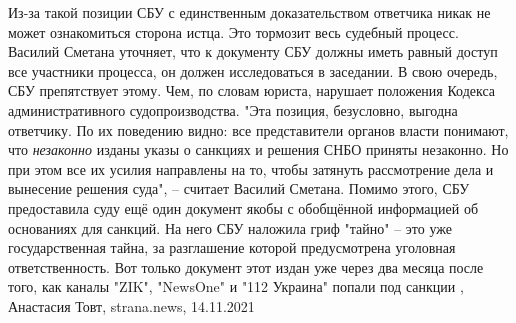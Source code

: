 Из-за такой позиции СБУ с единственным доказательством ответчика никак не может
ознакомиться сторона истца. Это тормозит весь судебный процесс.  Василий
Сметана уточняет, что к документу СБУ должны иметь равный доступ все участники
процесса, он должен исследоваться в заседании. В свою очередь, СБУ препятствует
этому. Чем, по словам юриста, нарушает положения Кодекса административного
судопроизводства.  "Эта позиция, безусловно, выгодна ответчику. По их поведению
видно: все представители органов власти понимают, что \emph{незаконно} изданы указы о
санкциях и решения СНБО приняты незаконно. Но при этом все их усилия направлены
на то, чтобы затянуть рассмотрение дела и вынесение решения суда", – считает
Василий Сметана.  Помимо этого, СБУ предоставила суду ещё один документ якобы с
обобщённой информацией об основаниях для санкций. На него СБУ наложила гриф
"тайно" – это уже государственная тайна, за разглашение которой предусмотрена
уголовная ответственность.  Вот только документ этот издан уже через два месяца
после того, как каналы "ZIK", "NewsOne" и "112 Украина" попали под санкции
, 
Анастасия Товт, strana.news, 14.11.2021
